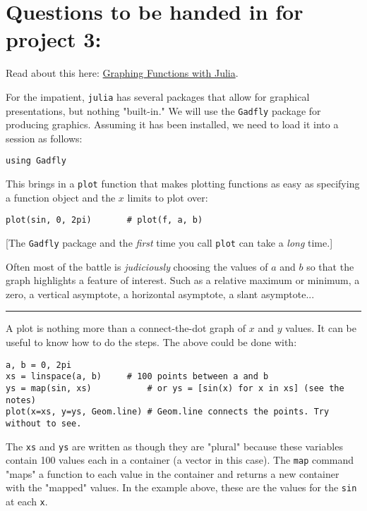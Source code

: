 \documentclass[12pt]{article}
\begin{document}
\section{Questions to be handed in for project 3:}

Read about this here:
\href{http://mth229.github.io/graphing.html}{Graphing Functions with
Julia}.

For the impatient, \texttt{julia} has several packages that allow for
graphical presentations, but nothing "built-in." We will use the
\texttt{Gadfly} package for producing graphics. Assuming it has been
installed, we need to load it into a session as follows:



\begin{verbatim}
using Gadfly 
\end{verbatim}
This brings in a \texttt{plot} function that makes plotting functions as
easy as specifying a function object and the $x$ limits to plot over:



\begin{verbatim}
plot(sin, 0, 2pi)       # plot(f, a, b)
\end{verbatim}
{[}The \texttt{Gadfly} package and the \emph{first} time you call
\texttt{plot} can take a \emph{long} time.{]}

Often most of the battle is \emph{judiciously} choosing the values of
$a$ and $b$ so that the graph highlights a feature of interest. Such as
a relative maximum or minimum, a zero, a vertical asymptote, a
horizontal asymptote, a slant asymptote...

\begin{center}\rule{3in}{0.4pt}\end{center}

A plot is nothing more than a connect-the-dot graph of $x$ and $y$
values. It can be useful to know how to do the steps. The above could be
done with:



\begin{verbatim}
a, b = 0, 2pi
xs = linspace(a, b)     # 100 points between a and b
ys = map(sin, xs)           # or ys = [sin(x) for x in xs] (see the notes)
plot(x=xs, y=ys, Geom.line) # Geom.line connects the points. Try without to see.
\end{verbatim}
The \texttt{xs} and \texttt{ys} are written as though they are "plural"
because these variables contain 100 values each in a container (a vector
in this case). The \texttt{map} command "maps" a function to each value
in the container and returns a new container with the "mapped" values.
In the example above, these are the values for the \texttt{sin} at each
\texttt{x}.
\end{document}
